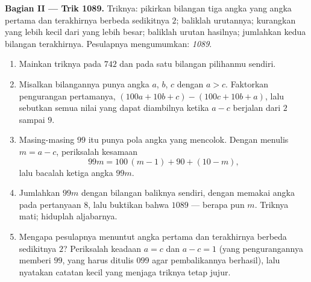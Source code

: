 \begin{problem}
\medskip
\noindent\textbf{Bagian II --- Trik 1089.}
Triknya: pikirkan bilangan tiga angka yang angka pertama dan
terakhirnya berbeda sedikitnya $2$; baliklah urutannya; kurangkan
yang lebih kecil dari yang lebih besar; baliklah urutan hasilnya;
jumlahkan kedua bilangan terakhirnya. Pesulapnya mengumumkan:
\emph{1089}.
\begin{enumerate}[resume]
  \item Mainkan triknya pada $742$ dan pada satu bilangan pilihanmu
        sendiri.
  \item Misalkan bilangannya punya angka $a$, $b$, $c$ dengan
        $a > c$. Faktorkan pengurangan pertamanya,
        $(100a + 10b + c) - (100c + 10b + a)$, lalu sebutkan semua
        nilai yang dapat diambilnya ketika $a - c$ berjalan dari $2$
        sampai $9$.
  \item Masing-masing  $99$ itu punya pola angka yang
        mencolok. Dengan menulis $m = a - c$, periksalah kesamaan
        \[
        99m = 100\,(m - 1) + 90 + (10 - m),
        \]
        lalu bacalah ketiga angka $99m$.
  \item Jumlahkan $99m$ dengan bilangan baliknya sendiri, dengan
        memakai angka pada pertanyaan 8, lalu buktikan bahwa
         $1089$ --- berapa pun $m$. Triknya mati; hiduplah
        aljabarnya.
  \item Mengapa pesulapnya menuntut angka pertama dan terakhirnya
        berbeda sedikitnya $2$? Periksalah keadaan $a = c$ dan
        $a - c = 1$ (yang pengurangannya memberi $99$, yang harus
        ditulis $099$ agar pembalikannya berhasil), lalu nyatakan
        catatan kecil yang menjaga triknya tetap jujur.
\end{enumerate}


\end{problem}

